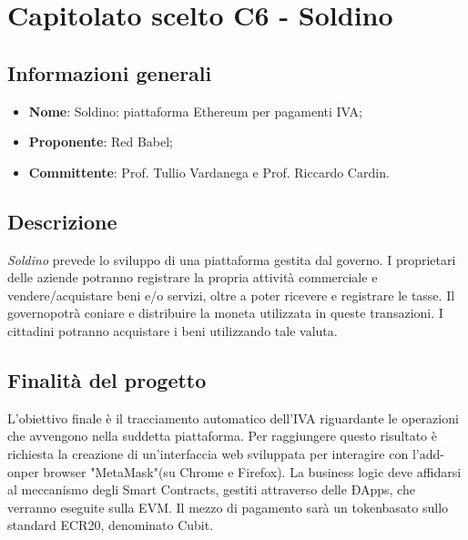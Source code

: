 \section{Capitolato scelto C6 - Soldino}
\subsection{Informazioni generali}
% 
\begin{itemize}
\item \textbf{Nome}: Soldino: piattaforma Ethereum per pagamenti IVA;
\item \textbf{Proponente}: Red Babel;
\item \textbf{Committente}: Prof. Tullio Vardanega e Prof. Riccardo Cardin.
\end{itemize}

\subsection{Descrizione}
\textit{Soldino} prevede lo sviluppo di una piattaforma gestita dal governo\glo. I proprietari delle aziende potranno registrare la propria attività commerciale e vendere/acquistare beni e/o servizi, oltre a poter ricevere e registrare le tasse. Il governo\glosp potrà coniare e distribuire la moneta utilizzata in queste transazioni. I cittadini potranno acquistare i beni utilizzando tale valuta.

\subsection{Finalità del progetto}
L'obiettivo finale è il tracciamento automatico dell'IVA riguardante le operazioni che avvengono nella suddetta piattaforma. Per raggiungere questo risultato è richiesta la creazione di un'interfaccia web sviluppata per interagire con l'add-on\glosp per browser "MetaMask"\glosp (su Chrome e Firefox). La business logic deve affidarsi al meccanismo degli Smart Contracts\glo, gestiti attraverso delle ÐApps\glo, che verranno eseguite sulla EVM\glo. Il mezzo di pagamento sarà un token\glosp basato sullo standard ECR20\glo, denominato Cubit\glo. 


